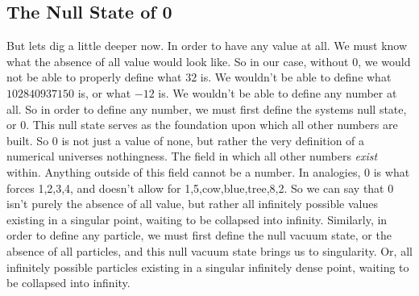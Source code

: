 \documentclass[11pt]{article}
\begin{document}
    \subsection{The Null State of 0}
        \hspace{1em}
        But lets dig a little deeper now. In order to have any value at all. We must know what the absence of all value would look like.
        So in our case, without $0$, we would not be able to properly define what $32$ is.
        We wouldn't be able to define what $102840937150$ is, or what $-12$ is.
        We wouldn't be able to define any number at all.
        So in order to define any number, we must first define the systems null state, or $0$.
        This null state serves as the foundation upon which all other numbers are built.
        So 0 is not just a value of none, but rather the very definition of a numerical universes nothingness.
        The field in which all other numbers \emph{exist} within. Anything outside of this field cannot be a number.
        In analogies, 0 is what forces 1,2,3,4, and doesn't allow for 1,5,cow,blue,tree,8,2.
        So we can say that $0$ isn't purely the absence of all value, but rather all infinitely possible values existing in a singular point, waiting to be collapsed into infinity.
        Similarly, in order to define any particle, we must first define the null vacuum state, or the absence of all particles, and this null vacuum state brings us to singularity.
        Or, all infinitely possible particles existing in a singular infinitely dense point, waiting to be collapsed into infinity.
\end{document}

